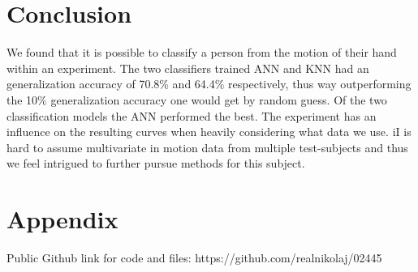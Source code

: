 \documentclass{article}
\begin{document}
\section{Conclusion}
We found that it is possible to classify a person from the motion of their hand within an experiment. The two classifiers trained ANN and KNN had an generalization accuracy of 70.8\% and 64.4\% respectively, thus way outperforming the 10\% generalization accuracy one would get by random guess. Of the two classification models the ANN performed the best.
The experiment has an influence on the resulting curves when heavily considering what data we use. iI is hard to assume multivariate in motion data from multiple test-subjects and thus we feel intrigued to further pursue methods for this subject.

\section{Appendix}
Public Github link for code and files: https://github.com/realnikolaj/02445
\end{document}
